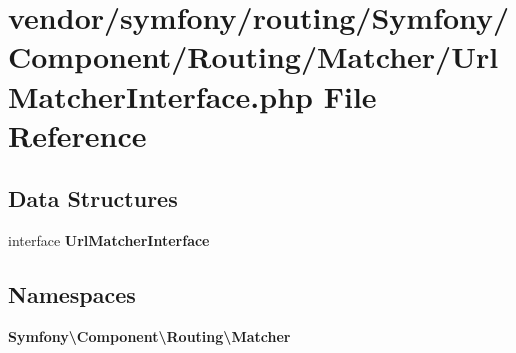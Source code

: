 \section{vendor/symfony/routing/\+Symfony/\+Component/\+Routing/\+Matcher/\+Url\+Matcher\+Interface.php File Reference}
\label{_url_matcher_interface_8php}
\subsection*{Data Structures}
\begin{DoxyCompactItemize}
\item 
interface {\bf Url\+Matcher\+Interface}
\end{DoxyCompactItemize}
\subsection*{Namespaces}
\begin{DoxyCompactItemize}
\item 
 {\bf Symfony\textbackslash{}\+Component\textbackslash{}\+Routing\textbackslash{}\+Matcher}
\end{DoxyCompactItemize}
